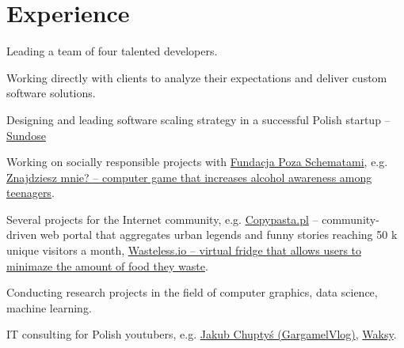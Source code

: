 \documentclass[]{deedy-resume-reversed}
\begin{document}
%
%

%
%

%
%

\begin{minipage}[t]{0.60\textwidth}


\section{Experience}
\vspace{\topsep} %
\begin{tightemize}
\item Leading a team of four talented developers.
\item Working directly with clients to analyze their expectations and deliver custom software solutions.
\item Designing and leading software scaling strategy in a successful Polish startup -- \href{https://sundose.io}{Sundose}
\item Working on socially responsible projects with \href{https://fundacjapozaschematami.pl}{Fundacja Poza Schematami}, e.g. \href{https://znajdzieszmnie.pl}{Znajdziesz mnie? -- computer game that increases alcohol awareness among teenagers}.
\item Several projects for the Internet community, e.g. \href{https://copypasta.pl}{Copypasta.pl}  -- community-driven web portal that aggregates urban legends and funny stories reaching 50 k unique visitors a month, \href{https://wasteless.io}{Wasteless.io -- virtual fridge that allows users to minimaze the amount of food they waste}.
\item Conducting research projects in the field of computer graphics, data science, machine learning.
\item IT consulting for Polish youtubers, e.g. \href{https://www.youtube.com/user/GargamelVlog}{Jakub Chuptyś (GargamelVlog)}, \href{https://www.youtube.com/channel/UCrtZVvEXEYWO1J_nOzL3fiw}{Waksy}.
\end{tightemize}
\sectionsep


\end{minipage}
\end{document}
